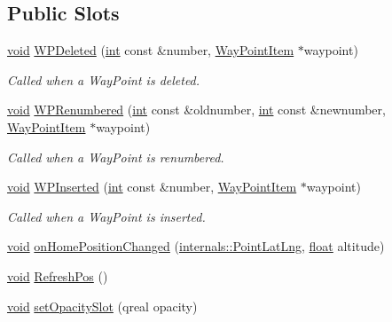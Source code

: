 \subsection*{Public Slots}
\begin{DoxyCompactItemize}
\item 
\hyperlink{group___u_a_v_objects_plugin_ga444cf2ff3f0ecbe028adce838d373f5c}{void} \hyperlink{group___o_p_map_widget_ga4f73652bac019e1b92fc67c4a2403b2b}{W\-P\-Deleted} (\hyperlink{ioapi_8h_a787fa3cf048117ba7123753c1e74fcd6}{int} const \&number, \hyperlink{classmapcontrol_1_1_way_point_item}{Way\-Point\-Item} $\ast$waypoint)
\begin{DoxyCompactList}\small\item\em Called when a Way\-Point is deleted. \end{DoxyCompactList}\item 
\hyperlink{group___u_a_v_objects_plugin_ga444cf2ff3f0ecbe028adce838d373f5c}{void} \hyperlink{group___o_p_map_widget_ga071a506384379c4aabb30ea5dc0fa4e1}{W\-P\-Renumbered} (\hyperlink{ioapi_8h_a787fa3cf048117ba7123753c1e74fcd6}{int} const \&oldnumber, \hyperlink{ioapi_8h_a787fa3cf048117ba7123753c1e74fcd6}{int} const \&newnumber, \hyperlink{classmapcontrol_1_1_way_point_item}{Way\-Point\-Item} $\ast$waypoint)
\begin{DoxyCompactList}\small\item\em Called when a Way\-Point is renumbered. \end{DoxyCompactList}\item 
\hyperlink{group___u_a_v_objects_plugin_ga444cf2ff3f0ecbe028adce838d373f5c}{void} \hyperlink{group___o_p_map_widget_ga5a663a828366d996f76a646e2cad90ec}{W\-P\-Inserted} (\hyperlink{ioapi_8h_a787fa3cf048117ba7123753c1e74fcd6}{int} const \&number, \hyperlink{classmapcontrol_1_1_way_point_item}{Way\-Point\-Item} $\ast$waypoint)
\begin{DoxyCompactList}\small\item\em Called when a Way\-Point is inserted. \end{DoxyCompactList}\item 
\hyperlink{group___u_a_v_objects_plugin_ga444cf2ff3f0ecbe028adce838d373f5c}{void} \hyperlink{group___o_p_map_widget_gaacddad340f4910d2ddbc811183adb83c}{on\-Home\-Position\-Changed} (\hyperlink{structinternals_1_1_point_lat_lng}{internals\-::\-Point\-Lat\-Lng}, \hyperlink{_super_l_u_support_8h_a6a1bb6ed41f44b60e7bd83b0e9945aa7}{float} altitude)
\item 
\hyperlink{group___u_a_v_objects_plugin_ga444cf2ff3f0ecbe028adce838d373f5c}{void} \hyperlink{group___o_p_map_widget_ga0fa8c77130a9df8c2057ea0078606e0f}{Refresh\-Pos} ()
\item 
\hyperlink{group___u_a_v_objects_plugin_ga444cf2ff3f0ecbe028adce838d373f5c}{void} \hyperlink{group___o_p_map_widget_ga31fd5de287142c02d4bd478b4aacdf52}{set\-Opacity\-Slot} (qreal opacity)
\end{DoxyCompactItemize}
